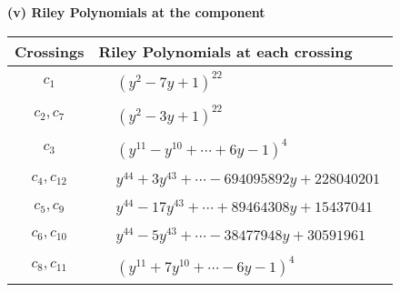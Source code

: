\documentclass[1p]{elsarticle_modified}
\theoremstyle{definition}
\begin{document}
\flushleft \textbf{(v) Riley Polynomials at the component}\newline \\
\begin{tabular}{m{50pt}|m{274pt}}
Crossings & \hspace{64pt}Riley Polynomials at each crossing \\
\hline $$\begin{aligned}c_{1}\end{aligned}$$&$\begin{aligned}
&(y^2-7 y+1)^{22}
\end{aligned}$\\
\hline $$\begin{aligned}c_{2},c_{7}\end{aligned}$$&$\begin{aligned}
&(y^2-3 y+1)^{22}
\end{aligned}$\\
\hline $$\begin{aligned}c_{3}\end{aligned}$$&$\begin{aligned}
&(y^{11}- y^{10}+\cdots+6 y-1)^{4}
\end{aligned}$\\
\hline $$\begin{aligned}c_{4},c_{12}\end{aligned}$$&$\begin{aligned}
&y^{44}+3 y^{43}+\cdots-694095892 y+228040201
\end{aligned}$\\
\hline $$\begin{aligned}c_{5},c_{9}\end{aligned}$$&$\begin{aligned}
&y^{44}-17 y^{43}+\cdots+89464308 y+15437041
\end{aligned}$\\
\hline $$\begin{aligned}c_{6},c_{10}\end{aligned}$$&$\begin{aligned}
&y^{44}-5 y^{43}+\cdots-38477948 y+30591961
\end{aligned}$\\
\hline $$\begin{aligned}c_{8},c_{11}\end{aligned}$$&$\begin{aligned}
&(y^{11}+7 y^{10}+\cdots-6 y-1)^{4}
\end{aligned}$\\
\hline
\end{tabular}\\~\\
\end{document}
